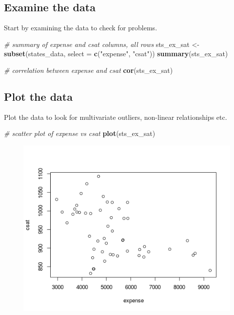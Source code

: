 \documentclass[]{book}
\newenvironment{Shaded}{\begin{snugshade}}{\end{snugshade}}
\newcommand{\KeywordTok}[1]{\textcolor[rgb]{0.13,0.29,0.53}{\textbf{#1}}}
\newcommand{\DataTypeTok}[1]{\textcolor[rgb]{0.13,0.29,0.53}{#1}}
\newcommand{\StringTok}[1]{\textcolor[rgb]{0.31,0.60,0.02}{#1}}
\newcommand{\CommentTok}[1]{\textcolor[rgb]{0.56,0.35,0.01}{\textit{#1}}}
\newcommand{\NormalTok}[1]{#1}
\begin{document}
\subsection{Examine the data}\label{examine-the-data}

Start by examining the data to check for problems.

\begin{Shaded}
\begin{Highlighting}[]
  \CommentTok{# summary of expense and csat columns, all rows}
\NormalTok{  sts_ex_sat <-}\StringTok{ }\KeywordTok{subset}\NormalTok{(states_data, }\DataTypeTok{select =} \KeywordTok{c}\NormalTok{(}\StringTok{"expense"}\NormalTok{, }\StringTok{"csat"}\NormalTok{))}
  \KeywordTok{summary}\NormalTok{(sts_ex_sat)}

  \CommentTok{# correlation between expense and csat}
  \KeywordTok{cor}\NormalTok{(sts_ex_sat) }
\end{Highlighting}
\end{Shaded}

\subsection{Plot the data}\label{plot-the-data}

Plot the data to look for multivariate outliers, non-linear
relationships etc.

\begin{Shaded}
\begin{Highlighting}[]
  \CommentTok{# scatter plot of expense vs csat}
  \KeywordTok{plot}\NormalTok{(sts_ex_sat)}
\end{Highlighting}
\end{Shaded}

\begin{figure}
\centering
\includegraphics{R/Rmodels/images/statesCorr1.png}
\caption{}
\end{figure}
\end{document}
